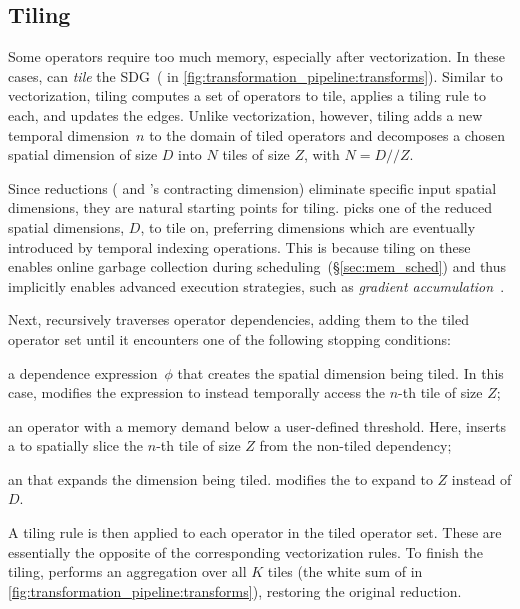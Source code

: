 \subsection{Tiling}
\label{sec:tiling}

Some operators require too much memory, especially after vectorization. In these cases, \sys{} can \emph{tile} the SDG~( in \F\ref{fig:transformation_pipeline:transforms}). Similar to vectorization, tiling computes a set of operators to tile, applies a tiling rule to each, and updates the edges. Unlike vectorization, however, tiling adds a new temporal dimension~$n$ to the domain of tiled operators and decomposes a chosen spatial dimension of size $D$ into $N$ tiles of size $Z$, with $N=D//Z$.


Since reductions (\eg {} and 's contracting dimension) eliminate specific input spatial dimensions, they are natural starting points for tiling. 
\sys{} picks one of the reduced spatial dimensions, $D$, to tile on, preferring dimensions which are eventually introduced by temporal indexing operations. This is because tiling on these enables
online garbage collection during scheduling~(\S\ref{sec:mem_sched}) and thus implicitly enables advanced execution strategies, such as \emph{gradient accumulation}~\cite{huang2019gpipe}.


Next, \sys{} recursively traverses operator dependencies, adding them to the tiled operator set until it encounters one of the following stopping conditions:
\begin{myitemize}
  \item a dependence expression~$\phi$ that creates the spatial dimension being tiled. In this case, \sys{} modifies the expression to instead temporally access the $n$-th tile of size $Z$;
  \item an operator with a memory demand below a user-defined threshold. Here, \sys{} inserts a  to spatially slice the $n$-th tile of size $Z$ from the non-tiled dependency;
  \item an  that expands the dimension being tiled. \sys{} modifies the  to expand to $Z$ instead of $D$.
\end{myitemize}

\noindent
A tiling rule is then applied to each operator in the tiled operator set. These are essentially the opposite of the corresponding vectorization rules.
To finish the tiling, \sys{} performs an aggregation over all $K$ tiles (\eg the white sum of  in \F\ref{fig:transformation_pipeline:transforms}), restoring the original reduction.

